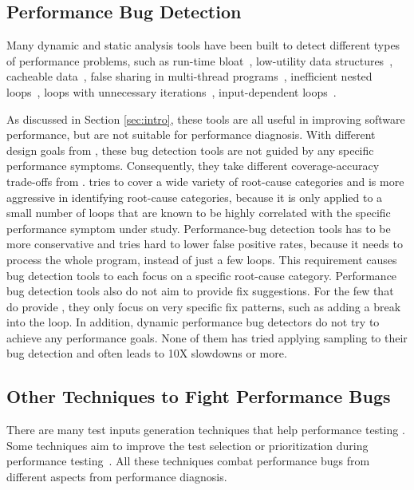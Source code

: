 \subsection{Performance Bug Detection}

Many dynamic and static analysis tools have been built to detect different
types of performance problems, such as 
run-time bloat~\cite{Dufour:2008:STC:1453101.1453111, Xu:2009:GFP:1542476.1542523, Xu:2010:DIC:1806596.1806616}, 
low-utility data structures~\cite{Xu:2010:FLD:1806596.1806617}, 
cacheable data~\cite{Cachetor}, false sharing in
multi-thread programs~\cite{Liu:2011:SPD:2048066.2048070},
inefficient nested loops~\cite{Alabama},
loops with unnecessary iterations~\cite{CARAMEL,IsilDillig.PLDI15},
input-dependent loops~\cite{xiao13:context}. 

As discussed in 
Section \ref{sec:intro}, these tools are all useful in improving software
performance, but are not suitable for performance diagnosis.
With different design goals from \Tool, these bug detection tools are not 
guided by any specific
performance symptoms. Consequently, they take different coverage-accuracy
trade-offs from \Tool. \Tool tries to cover a wide variety of root-cause 
categories and is more aggressive in identifying root-cause categories, because
it is only applied to a small number of loops that are known to be highly
correlated with the specific performance symptom under study.
Performance-bug detection tools has to be more conservative and tries hard
to lower false positive rates, because it needs to process the
whole program, instead of just a few loops. This requirement causes bug
detection tools to each focus on a specific root-cause category.
Performance bug detection tools also do not aim to provide fix suggestions.
For the few that do provide \cite{CARAMEL}, they only focus on very specific
fix patterns, such as adding a break into the loop. 
In addition, dynamic performance bug detectors do not try to achieve any
performance goals. None of them has tried applying sampling to their
bug detection and often leads to 10X slowdowns or more.

\subsection{Other Techniques to Fight Performance Bugs}

There are many test inputs generation techniques that help
performance testing 
\cite{WISE, EventBreak, SpeedGun}.
Some techniques aim to improve the test selection or prioritization during 
performance testing~\cite{Forepost,Huang:2014:PRT:2568225.2568232}.  
All these techniques combat performance bugs from different aspects from performance diagnosis.
